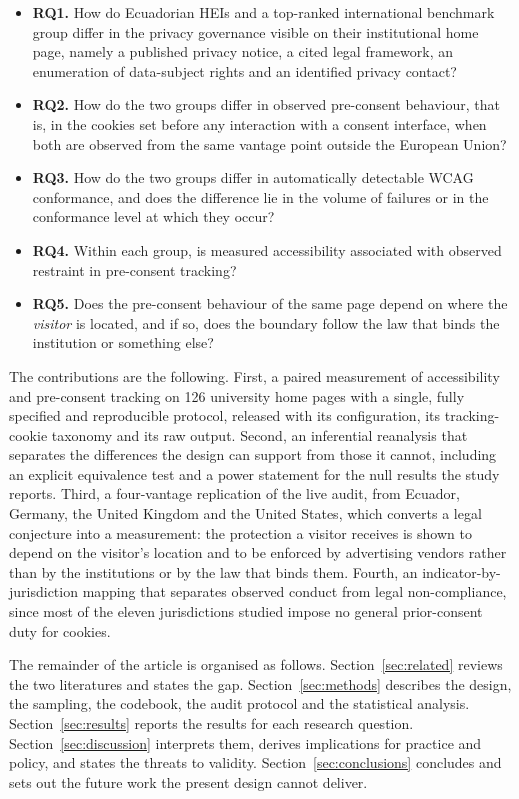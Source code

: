\documentclass[pdflatex,sn-basic,Numbered]{sn-jnl}
\theoremstyle{thmstyleone}
\theoremstyle{thmstyletwo}
\theoremstyle{thmstylethree}
\begin{document}
\begin{itemize}
	\item \textbf{RQ1.} How do Ecuadorian HEIs and a top-ranked international benchmark group differ in the privacy governance visible on their institutional home page, namely a published privacy notice, a cited legal framework, an enumeration of data-subject rights and an identified privacy contact?
	\item \textbf{RQ2.} How do the two groups differ in observed pre-consent behaviour, that is, in the cookies set before any interaction with a consent interface, when both are observed from the same vantage point outside the European Union?
	\item \textbf{RQ3.} How do the two groups differ in automatically detectable WCAG conformance, and does the difference lie in the volume of failures or in the conformance level at which they occur?
	\item \textbf{RQ4.} Within each group, is measured accessibility associated with observed restraint in pre-consent tracking?
	\item \textbf{RQ5.} Does the pre-consent behaviour of the same page depend on where the \emph{visitor} is located, and if so, does the boundary follow the law that binds the institution or something else?
\end{itemize}

The contributions are the following. First, a paired measurement of accessibility and pre-consent tracking on 126 university home pages with a single, fully specified and reproducible protocol, released with its configuration, its tracking-cookie taxonomy and its raw output. Second, an inferential reanalysis that separates the differences the design can support from those it cannot, including an explicit equivalence test and a power statement for the null results the study reports. Third, a four-vantage replication of the live audit, from Ecuador, Germany, the United Kingdom and the United States, which converts a legal conjecture into a measurement: the protection a visitor receives is shown to depend on the visitor's location and to be enforced by advertising vendors rather than by the institutions or by the law that binds them. Fourth, an indicator-by-jurisdiction mapping that separates observed conduct from legal non-compliance, since most of the eleven jurisdictions studied impose no general prior-consent duty for cookies.

The remainder of the article is organised as follows. Section~\ref{sec:related} reviews the two literatures and states the gap. Section~\ref{sec:methods} describes the design, the sampling, the codebook, the audit protocol and the statistical analysis. Section~\ref{sec:results} reports the results for each research question. Section~\ref{sec:discussion} interprets them, derives implications for practice and policy, and states the threats to validity. Section~\ref{sec:conclusions} concludes and sets out the future work the present design cannot deliver.
\end{document}
